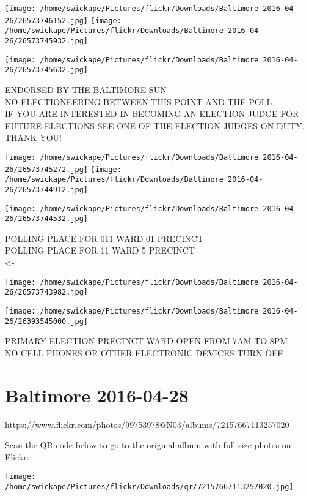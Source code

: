 \documentclass[10pt,letterpaper]{article}
\begin{document}
\texttt{[image: /home/swickape/Pictures/flickr/Downloads/Baltimore 2016-04-26/26573746152.jpg]}
\texttt{[image: /home/swickape/Pictures/flickr/Downloads/Baltimore 2016-04-26/26573745932.jpg]}

\vspace{0.25in}
\texttt{[image: /home/swickape/Pictures/flickr/Downloads/Baltimore 2016-04-26/26573745632.jpg]}

ENDORSED BY THE BALTIMORE SUN\\
NO ELECTIONEERING BETWEEN THIS POINT AND THE POLL\\
IF YOU ARE INTERESTED IN BECOMING AN ELECTION JUDGE FOR FUTURE ELECTIONS SEE ONE OF THE ELECTION JUDGES ON DUTY.  THANK YOU!
\pagebreak

\texttt{[image: /home/swickape/Pictures/flickr/Downloads/Baltimore 2016-04-26/26573745272.jpg]}
\texttt{[image: /home/swickape/Pictures/flickr/Downloads/Baltimore 2016-04-26/26573744912.jpg]}

\texttt{[image: /home/swickape/Pictures/flickr/Downloads/Baltimore 2016-04-26/26573744532.jpg]}

POLLING PLACE FOR 011 WARD 01 PRECINCT\\
POLLING PLACE FOR 11 WARD 5 PRECINCT\\
<{-}
\pagebreak

\texttt{[image: /home/swickape/Pictures/flickr/Downloads/Baltimore 2016-04-26/26573743982.jpg]}

\vspace{0.25in}
\texttt{[image: /home/swickape/Pictures/flickr/Downloads/Baltimore 2016-04-26/26393545000.jpg]}

PRIMARY ELECTION PRECINCT WARD OPEN FROM 7AM TO 8PM\\
NO CELL PHONES OR OTHER ELECTRONIC DEVICES TURN OFF
\pagebreak

\section*{Baltimore 2016-04-28}

\url{https://www.flickr.com/photos/99753978@N03/albums/72157667113257020}

Scan the QR code below to go to the original album with full-size photos on Flickr:

\texttt{[image: /home/swickape/Pictures/flickr/Downloads/qr/72157667113257020.jpg]}
\pagebreak
\end{document}
